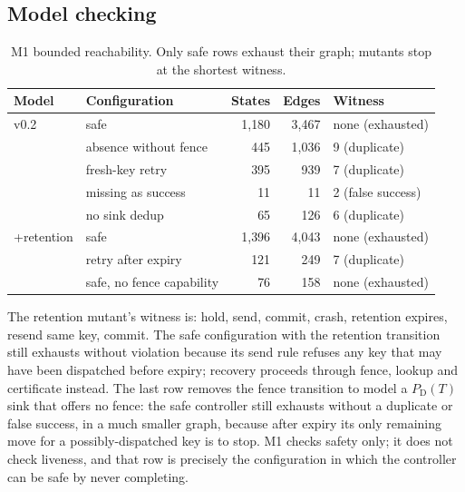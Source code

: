 \documentclass[conference,10pt]{IEEEtran}
\newcommand{\PDT}{P_{\mathrm{D}}(T)}
\begin{document}
\subsection{Model checking}
\begin{table}[t]
\centering\footnotesize
\caption{M1 bounded reachability. Only safe rows exhaust their graph; mutants stop at the shortest witness.}
\label{tab:m1}
\begin{tabular}{@{}llrrl@{}}
\toprule
Model & Configuration & States & Edges & Witness\\
\midrule
v0.2 & safe & 1{,}180 & 3{,}467 & none (exhausted)\\
 & absence without fence & 445 & 1{,}036 & 9 (duplicate)\\
 & fresh-key retry & 395 & 939 & 7 (duplicate)\\
 & missing as success & 11 & 11 & 2 (false success)\\
 & no sink dedup & 65 & 126 & 6 (duplicate)\\
\midrule
+retention & safe & 1{,}396 & 4{,}043 & none (exhausted)\\
 & retry after expiry & 121 & 249 & 7 (duplicate)\\
 & safe, no fence capability & 76 & 158 & none (exhausted)\\
\bottomrule
\end{tabular}
\end{table}
The retention mutant's witness is: hold, send, commit, crash, retention expires, resend same key, commit. The safe configuration with the retention transition still exhausts without violation because its send rule refuses any key that may have been dispatched before expiry; recovery proceeds through fence, lookup and certificate instead. The last row removes the fence transition to model a $\PDT$ sink that offers no fence: the safe controller still exhausts without a duplicate or false success, in a much smaller graph, because after expiry its only remaining move for a possibly-dispatched key is to stop. M1 checks safety only; it does not check liveness, and that row is precisely the configuration in which the controller can be safe by never completing.
\end{document}
